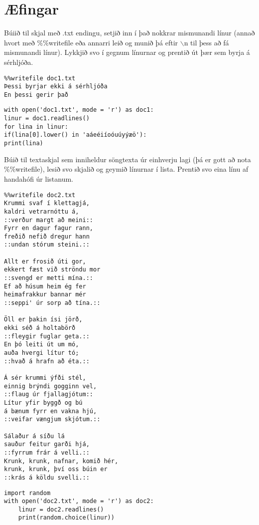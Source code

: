 \newpage
\section{Æfingar}

\begin{exercise}\label{doc1}
Búiið til skjal með .txt endingu, setjið inn í það nokkrar mismunandi línur (annað hvort með \%\%writefile eða annarri leið og munið þá eftir $\backslash$n til þess að fá mismunandi línur).
Lykkjið svo í gegnum línurnar og prentið út þær sem byrja á sérhljóða.
\end{exercise}
\begin{Answer}[ref={doc1}]

	\begin{lstlisting}
%%writefile doc1.txt
Þessi byrjar ekki á sérhljóða
En þessi gerir það
\end{lstlisting}
\begin{lstlisting}
with open('doc1.txt', mode = 'r') as doc1:
linur = doc1.readlines()
for lina in linur:
if(lina[0].lower() in 'aáeéiíoóuúyýæö'):
print(lina)\end{lstlisting}
\end{Answer}


\begin{exercise}\label{doc2}
Búið til textaskjal sem inniheldur söngtexta úr einhverju lagi (þá er gott að nota \%\%writefile), lesið svo skjalið og geymið línurnar í lista.
Prentið svo eina línu af handahófi úr listanum.
\end{exercise}
\begin{Answer}[ref={doc2}]
	\begin{lstlisting}
%%writefile doc2.txt
Krummi svaf í klettagjá,
kaldri vetrarnóttu á,
::verður margt að meini::
Fyrr en dagur fagur rann,
freðið nefið dregur hann
::undan stórum steini.::

Allt er frosið úti gor,
ekkert fæst við ströndu mor
::svengd er metti mína.::
Ef að húsum heim ég fer
heimafrakkur bannar mér
::seppi' úr sorp að tína.::

Öll er þakin ísi jörð,
ekki séð á holtabörð
::fleygir fuglar geta.::
En þó leiti út um mó,
auða hvergi lítur tó;
::hvað á hrafn að éta.::

Á sér krummi ýfði stél,
einnig brýndi gogginn vel,
::flaug úr fjallagjótum::
Lítur yfir byggð og bú
á bænum fyrr en vakna hjú,
::veifar vængjum skjótum.::

Sálaður á síðu lá
sauður feitur garði hjá,
::fyrrum frár á velli.::
Krunk, krunk, nafnar, komið hér,
krunk, krunk, því oss búin er
::krás á köldu svelli.::		
\end{lstlisting}
	\begin{lstlisting}
import random 
with open('doc2.txt', mode = 'r') as doc2:
	linur = doc2.readlines()
	print(random.choice(linur))
\end{lstlisting}
\end{Answer}